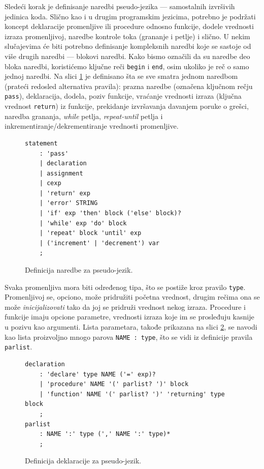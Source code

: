Sledeći korak je definisanje naredbi pseudo-jezika --- samostalnih izvršivih jedinica koda. Slično kao i u drugim programskim jezicima, potrebno je podržati koncept deklaracije promenljive ili procedure odnosno funkcije, dodele vrednosti izraza promenljivoj, naredbe kontrole toka (grananje i petlje) i slično. U nekim slučajevima će biti potrebno definisanje kompleksnih naredbi koje se sastoje od više drugih naredbi --- blokovi naredbi. Kako bismo označili da su naredbe deo bloka naredbi, koristićemo ključne reči \texttt{begin} i \texttt{end}, osim ukoliko je reč o samo jednoj naredbi. Na slici \ref{fig:PseudoDef2} je definisano šta se sve smatra jednom naredbom (prateći redosled alternativa pravila): prazna naredbe (označena ključnom rečju \texttt{pass}), deklaracija, dodela, poziv funkcije, vraćanje vrednosti izraza (ključna vrednost \texttt{return}) iz funkcije, prekidanje izvršavanja davanjem poruke o grešci, naredba grananja, \emph{while} petlja, \emph{repeat-until} petlja i inkrementiranje/dekrementiranje vrednosti promenljive. 
    
\begin{figure}[h!]
\begin{lstlisting}[language={}]
statement
    : 'pass'
    | declaration
    | assignment
    | cexp
    | 'return' exp
    | 'error' STRING
    | 'if' exp 'then' block ('else' block)? 
    | 'while' exp 'do' block 
    | 'repeat' block 'until' exp
    | ('increment' | 'decrement') var	
    ;
\end{lstlisting}
\caption{Definicija naredbe za pseudo-jezik.}
\label{fig:PseudoDef2}
\end{figure}

Svaka promenljiva mora biti određenog tipa, što se postiže kroz pravilo \texttt{type}. Promenljivoj se, opciono, može pridružiti početna vrednost, drugim rečima ona se može \emph{inicijalizovati} tako da joj se pridruži vrednost nekog izraza. Procedure i funkcije imaju opcione parametre, vrednosti izraza koje im se prosleđuju kasnije u pozivu kao argumenti. Lista parametara, takođe prikazana na slici \ref{fig:PseudoDef3}, se navodi kao lista proizvoljno mnogo parova \texttt{NAME : type}, što se vidi iz definicije pravila \texttt{parlist}.

\begin{figure}[h!]
\begin{lstlisting}[language={}]
declaration
    : 'declare' type NAME ('=' exp)? 
    | 'procedure' NAME '(' parlist? ')' block 
    | 'function' NAME '(' parlist? ')' 'returning' type block 
    ;
parlist
    : NAME ':' type (',' NAME ':' type)*
    ;
\end{lstlisting}
\caption{Definicija deklaracije za pseudo-jezik.}
\label{fig:PseudoDef3}
\end{figure}

